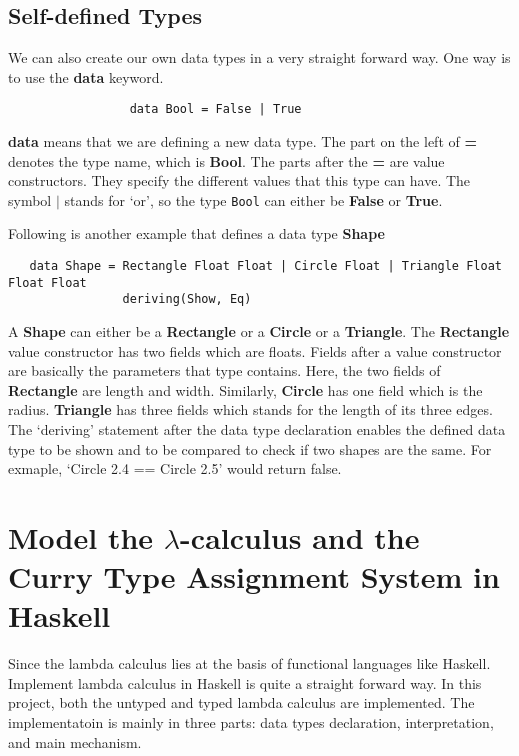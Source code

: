 \subsection{Self-defined Types}

We can also create our own data types in a very straight forward way. One way is to use the \textbf{data} keyword.

\begin{verbatim}
                 data Bool = False | True
\end{verbatim} 

\textbf{data} means that we are defining a new data type. The part on the left of \textbf{=} denotes the type name, which is \textbf{Bool}. The parts after the \textbf{=} are value constructors. They specify the different values that this type can have. The symbol $|$ stands for `or', so the type \verb|Bool| can either be \textbf{False} or \textbf{True}. 

Following is another example that defines a data type \textbf{Shape}

\begin{verbatim}
   data Shape = Rectangle Float Float | Circle Float | Triangle Float Float Float
                deriving(Show, Eq)  
\end{verbatim}

A \textbf{Shape} can either be a \textbf{Rectangle} or a \textbf{Circle} or a \textbf{Triangle}. The \textbf{Rectangle} value constructor has two fields which are floats. Fields after a value constructor are basically the parameters that type contains. Here, the two fields of \textbf{Rectangle} are length and width. Similarly, \textbf{Circle} has one field which is the radius. \textbf{Triangle} has three fields which stands for the length of its three edges. The `deriving' statement after the data type declaration enables the defined data type to be shown and to be compared to check if two shapes are the same. For exmaple, `Circle 2.4 == Circle 2.5' would return false. 

\section{Model the $\lambda$-calculus and the Curry Type Assignment System in Haskell}

Since the lambda calculus lies at the basis of functional languages like Haskell. Implement lambda calculus in Haskell is quite a straight forward way. In this project, both the untyped and typed lambda calculus are implemented. The implementatoin is mainly in three parts: data types declaration, interpretation, and main mechanism.

